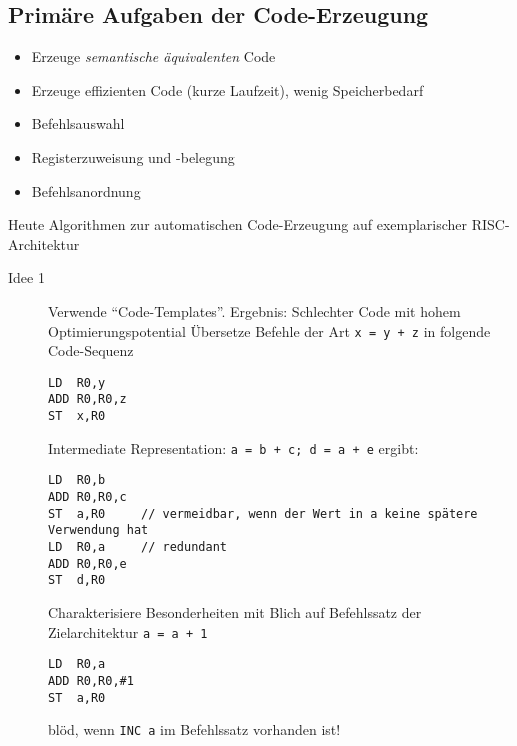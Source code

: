 \subsection{Primäre Aufgaben der Code-Erzeugung}
\begin{itemize}
 \item Erzeuge \emph{semantische äquivalenten} Code
 \item Erzeuge effizienten Code (kurze Laufzeit), wenig Speicherbedarf
 \item Befehlsauswahl
 \item Registerzuweisung und -belegung
 \item Befehlsanordnung
\end{itemize}
Heute Algorithmen zur automatischen Code-Erzeugung auf exemplarischer RISC-Architektur
\begin{description}
\item[Idee 1] Verwende "`Code-Templates"'. Ergebnis: Schlechter Code mit hohem Optimierungspotential
    \Bsp Übersetze Befehle der Art \texttt{x = y + z} in folgende Code-Sequenz
        \begin{verbatim}
LD  R0,y
ADD R0,R0,z
ST  x,R0
        \end{verbatim}
    Intermediate Representation: \texttt{a = b + c; d = a + e} ergibt:
    \begin{verbatim}
LD  R0,b
ADD R0,R0,c
ST  a,R0     // vermeidbar, wenn der Wert in a keine spätere Verwendung hat
LD  R0,a     // redundant
ADD R0,R0,e
ST  d,R0
    \end{verbatim}
    Charakterisiere Besonderheiten mit Blich auf Befehlssatz der Zielarchitektur
    \Bsp \texttt{a = a + 1}
        \begin{verbatim}
LD  R0,a
ADD R0,R0,#1
ST  a,R0
        \end{verbatim}
        blöd, wenn \texttt{INC a} im Befehlssatz vorhanden ist!
\end{description}


